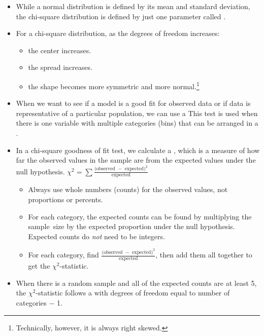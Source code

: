 \begin{itemize}

\item While a normal distribution is defined by its mean and standard deviation, the chi-square distribution is defined by just one parameter called .  
\item For a chi-square distribution, as the degrees of freedom increases:  \vspace{-1mm}
\begin{itemize}
\setlength{\itemsep}{0mm}
\item the center increases.\item  the spread increases.  
\item the shape becomes more symmetric and more normal.\footnote{Technically, however, it is always right skewed.}
\end{itemize}

\item When we want to see if a model is a good fit for observed data or if data is representative of a particular population, we can use a   This test is used when there is one variable with multiple categories (bins) that can be arranged in a .

\item In a chi-square goodness of fit test, we calculate a , which is a measure of how far the observed values in the sample are from the expected values under the null hypothesis. $\chi^2 =\sum{ \frac{\text{(observed } - \text{ expected})^2}{\text{expected}}}$ 
\begin{itemize}\vspace{-1mm}
\item Always use whole numbers (counts) for the observed values, not proportions or percents.
\item For each category, the expected counts can be found by multiplying the sample~size by the expected proportion under the null hypothesis.  Expected counts do \emph{not} need to be integers.  
\item For each category, find $\frac{\text{(observed } - \text{ expected})^2}{\text{expected}}$, then add them all together to get the $\chi^2$-statistic.
\end{itemize}

\item When there is a random sample and all of the expected counts are at least 5, the $\chi^2$-statistic follows a  with degrees of freedom equal to number of categories $-$ 1.


\end{itemize}
